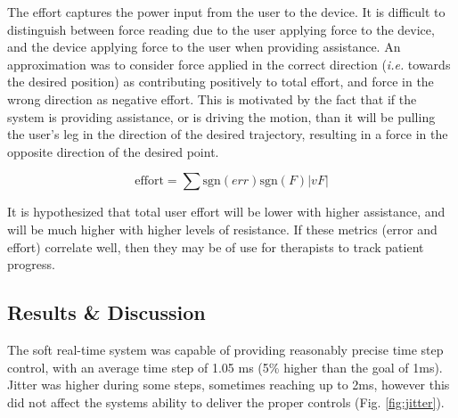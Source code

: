 \documentclass[12pt]{report}
\begin{document}
The effort captures the power input from the user to the device. It is difficult to distinguish between force reading due to the user applying force to the device, and the device applying force to the user when providing assistance. An approximation was to consider force applied in the correct direction (\textit{i.e.} towards the desired position) as contributing positively to total effort, and force in the wrong direction as negative effort. This is motivated by the fact that if the system is providing assistance, or is driving the motion, than it will be pulling the user's leg in the direction of the desired trajectory, resulting in a force in the opposite direction of the desired point. 
	
\begin{equation}
\text{effort} =  \sum \text{sgn}(err)\text{sgn}(F)|vF|
\end{equation}	

It is hypothesized that total user effort will be lower with higher assistance, and will be much higher with higher levels of resistance. If these metrics (error and effort) correlate well, then they may be of use for therapists to track patient progress. 
	
		\subsection{Results \& Discussion} \label{sec:results} 
		
		The soft real-time system was capable of providing reasonably precise time step control, with an average time step of 1.05 ms (5\% higher than the goal of 1ms). Jitter was higher during some steps, sometimes reaching up to 2ms, however this did not affect the systems ability to deliver the proper controls (Fig. \ref{fig:jitter}). 

\end{document}
